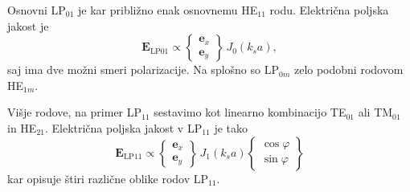 Osnovni LP$_{01}$ je kar približno enak osnovnemu HE$_{11}$ rodu. Električna poljska jakost je 
\begin{equation}
\mathbf{E}_\mathrm{LP01} \propto 
\left \{
  \begin{matrix}
  \mathbf{e}_x \\ \mathbf{e}_y 
  \end{matrix}
\right \} \, J_0(k_s a),
\end{equation}
saj ima dve možni smeri polarizacije. Na splošno so LP$_{0m}$ zelo podobni rodovom HE$_{1m}$. 

Višje rodove, na primer LP$_{11}$ sestavimo kot linearno kombinacijo 
TE$_{01}$ ali TM$_{01}$ in HE$_{21}$.
Električna poljska jakost v LP$_{11}$ je tako 
\begin{equation}
\mathbf{E}_\mathrm{LP11} \propto \left \{
  \begin{matrix}
  \mathbf{e}_x \\ \mathbf{e}_y 
  \end{matrix}
\right \} \, J_1(k_s a)
\left \{
  \begin{matrix}
  \cos\varphi  \\ \sin\varphi 
  \end{matrix}
\right \}
\end{equation}
kar opisuje štiri različne oblike rodov LP$_{11}$.

